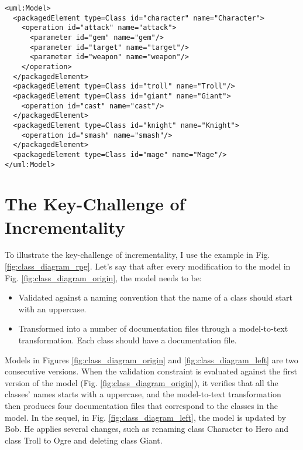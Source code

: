 \begin{lstlisting}[style=xmi,caption={State-based representation of the model of Figure \ref{fig:class_diagram_origin} in (simplified) XMI.},label=lst:xmimodel]
<uml:Model>
  <packagedElement type=Class id="character" name="Character">
    <operation id="attack" name="attack">
      <parameter id="gem" name="gem"/>
      <parameter id="target" name="target"/>
      <parameter id="weapon" name="weapon"/>
    </operation>
  </packagedElement>
  <packagedElement type=Class id="troll" name="Troll"/>
  <packagedElement type=Class id="giant" name="Giant">
    <operation id="cast" name="cast"/>
  </packagedElement>
  <packagedElement type=Class id="knight" name="Knight">
    <operation id="smash" name="smash"/>
  </packagedElement>
  <packagedElement type=Class id="mage" name="Mage"/>
</uml:Model>
\end{lstlisting}

\section{The Key-Challenge of Incrementality}
\label{sec:the_key_challenge_of_ _incrementality}
To illustrate the key-challenge of incrementality, I use the example in Fig. \ref{fig:class_diagram_rpg}. Let's say that after every modification to the model in Fig. \ref{fig:class_diagram_origin}, the model needs to be:

\begin{itemize}
    \item Validated against a naming convention that the name of a class should start with an uppercase.
    \item Transformed into a number of documentation files through a model-to-text transformation. Each class should have a documentation file.
\end{itemize}

Models in Figures \ref{fig:class_diagram_origin} and \ref{fig:class_diagram_left} are two consecutive versions. When the validation constraint is evaluated against the first version of the model (Fig. \ref{fig:class_diagram_origin}), it verifies that all the classes' names starts with a uppercase, and the model-to-text transformation then produces four documentation files that correspond to the classes in the model. In the sequel, in Fig. \ref{fig:class_diagram_left}, the model is updated by Bob. He applies several changes, such as renaming class \textsf{Character} to \textsf{Hero} and class \textsf{Troll} to \textsf{Ogre} and deleting class \textsf{Giant}.

